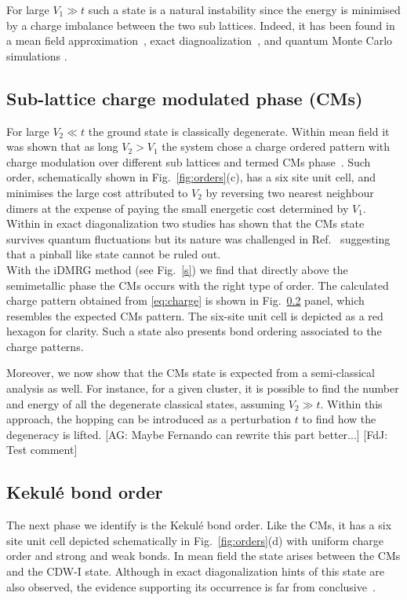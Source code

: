 \documentclass[aps,prx,10pt,twocolumn,floatfix,superscriptaddress,showpacs,numerical,footinbib]{revtex4-1}
\newcommand{\noteAG}[1]{{\color{blue} [AG: #1]}}
\newcommand{\noteFdJ}[1]{{\color{cyan} [FdJ: #1]}}
\begin{document}
For large $V_{1}\gg t$ such a state is a natural instability since the energy is minimised by a charge imbalance between the two sub lattices.
%
Indeed, it has been found in a mean field approximation~\cite{RQHZ08,WF10,GCCdJVV13}, exact diagnoalization~\cite{GGNVC13,DH14,DCH14}, and quantum Monte Carlo simulations
\cite{WCT14}.
%


\subsection{Sub-lattice charge modulated phase (CMs)}
%
For large $V_{2}\ll t$ the ground state is classically degenerate. 
%
Within mean field it was shown that as long $V_{2}>V_{1}$
the system chose a charge ordered pattern with charge modulation over different sub lattices and termed CMs phase~\cite{CMs}.
%
Such order, schematically shown in Fig.~\ref{fig:orders}(c), has a six site unit cell, and minimises the large cost
attributed to $V_{2}$ by reversing two nearest neighbour dimers at the expense of paying the small energetic cost
determined by $V_{1}$.
%
Within in exact diagonalization two studies has shown that the CMs state survives quantum fluctuations 
but its nature was challenged in Ref.~ suggesting that a pinball like state cannot be ruled out.\\

With the iDMRG method (see Fig.~\ref{s}) we find that directly above the semimetallic phase the CMs occurs with the right type of order.
%
The calculated charge pattern obtained from \eqref{eq:charge} is shown in Fig.~\ref{} panel, which resembles the expected
CMs pattern.
%
The six-site unit cell is depicted as a red hexagon for clarity. 
%
Such a state also presents bond ordering associated to the charge patterns.

% 
Moreover, we now show that the CMs state is expected from a semi-classical analysis as well.
%
For instance, for a given cluster, it is possible to find the number and energy of all the degenerate classical states, assuming $V_{2}\gg t$.
%
Within this approach, the hopping can be introduced as a perturbation $t$ to find how the degeneracy is lifted.
\noteAG{Maybe Fernando can rewrite this part better...} \noteFdJ{Test comment}


\subsection{Kekul\'{e} bond order}
%
The next phase we identify is the Kekul\'{e}
bond order.
%
Like the CMs, it has a six site unit cell depicted schematically in Fig.~\ref{fig:orders}(d)
with uniform charge order and strong and weak bonds.
%
In mean field the state arises between the CMs and the CDW-I state.
%
Although in exact diagonalization hints of this state are also observed,
the evidence supporting its occurrence is far from conclusive~\cite{GGNVC13}.
%
\end{document}
